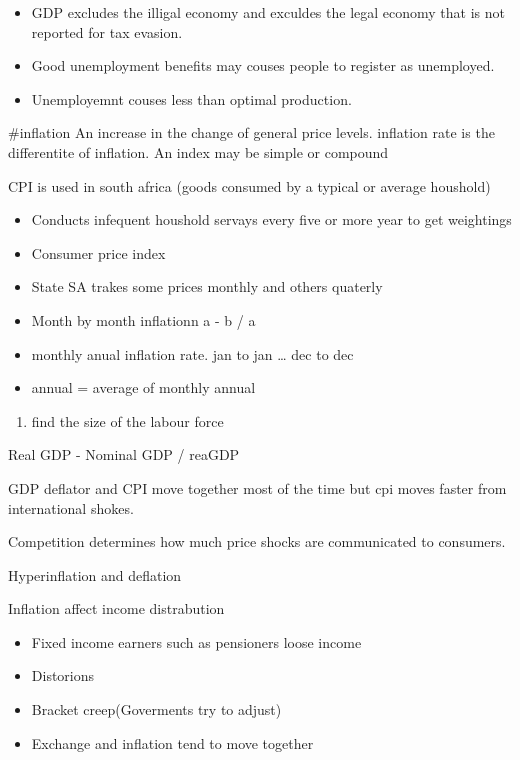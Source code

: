 \documentclass[twocolumn]{article}
\providecommand{\tightlist}{%
  \setlength{\itemsep}{0pt}\setlength{\parskip}{0pt}}
\begin{document}
\begin{itemize}
\tightlist
\item
  GDP excludes the illigal economy and exculdes the legal economy that
  is not reported for tax evasion.
\item
  Good unemployment benefits may couses people to register as
  unemployed.
\item
  Unemployemnt couses less than optimal production.
\end{itemize}

\#inflation An increase in the change of general price levels. inflation
rate is the differentite of inflation. An index may be simple or
compound

CPI is used in south africa (goods consumed by a typical or average
houshold)

\begin{itemize}
\tightlist
\item
  Conducts infequent houshold servays every five or more year to get
  weightings
\item
  Consumer price index
\item
  State SA trakes some prices monthly and others quaterly
\item
  Month by month inflationn a - b / a
\item
  monthly anual inflation rate. jan to jan \ldots{} dec to dec
\item
  annual = average of monthly annual
\end{itemize}

\begin{enumerate}
\tightlist
\item
  find the size of the labour force
\end{enumerate}

\begin{description}
\tightlist
\item[GDP deflator]
Real GDP - Nominal GDP / reaGDP
\end{description}

GDP deflator and CPI move together most of the time but cpi moves faster
from international shokes.

Competition determines how much price shocks are communicated to
consumers.

Hyperinflation and deflation

Inflation affect income distrabution

\begin{itemize}
\tightlist
\item
  Fixed income earners such as pensioners loose income
\item
  Distorions
\item
  Bracket creep(Goverments try to adjust)
\item
  Exchange and inflation tend to move together
\end{itemize}
\end{document}

